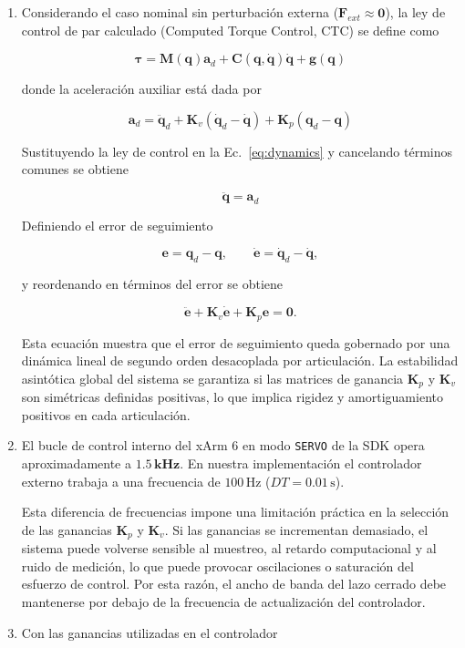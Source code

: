 \documentclass[journal,10pt,twoside]{IEEEtran}
\begin{document}
\begin{enumerate}[label=(\alph*)]

\item Considerando el caso nominal sin perturbación externa
($\bm{F}_{ext} \approx \bm{0}$), la ley de control de par calculado
(Computed Torque Control, CTC) se define como

\[
\bm{\tau} =
\bm{M}(\bm{q})\bm{a}_d
+
\bm{C}(\bm{q},\dot{\bm{q}})\dot{\bm{q}}
+
\bm{g}(\bm{q})
\]

donde la aceleración auxiliar está dada por

\[
\bm{a}_d =
\ddot{\bm{q}}_d
+
\bm{K}_v(\dot{\bm{q}}_d - \dot{\bm{q}})
+
\bm{K}_p(\bm{q}_d - \bm{q})
\]

Sustituyendo la ley de control en la Ec.~\eqref{eq:dynamics} y
cancelando términos comunes se obtiene

\[
\ddot{\bm{q}} = \bm{a}_d
\]

Definiendo el error de seguimiento

\[
\bm{e} = \bm{q}_d - \bm{q},
\qquad
\dot{\bm{e}} = \dot{\bm{q}}_d - \dot{\bm{q}},
\]

y reordenando en términos del error se obtiene

\[
\ddot{\bm{e}} + \bm{K}_v\dot{\bm{e}} + \bm{K}_p\bm{e} = \bm{0}.
\]

Esta ecuación muestra que el error de seguimiento queda gobernado
por una dinámica lineal de segundo orden desacoplada por
articulación. La estabilidad asintótica global del sistema se
garantiza si las matrices de ganancia $\bm{K}_p$ y $\bm{K}_v$
son simétricas definidas positivas, lo que implica rigidez
y amortiguamiento positivos en cada articulación.

\item El bucle de control interno del xArm 6 en modo
\texttt{SERVO} de la SDK opera aproximadamente a
$\mathbf{1.5\,kHz}$. En nuestra implementación el
controlador externo trabaja a una frecuencia de
$100\,\text{Hz}$ ($DT = 0.01\,\text{s}$).

Esta diferencia de frecuencias impone una limitación
práctica en la selección de las ganancias $\bm{K}_p$
y $\bm{K}_v$. Si las ganancias se incrementan demasiado,
el sistema puede volverse sensible al muestreo,
al retardo computacional y al ruido de medición,
lo que puede provocar oscilaciones o saturación del
esfuerzo de control. Por esta razón, el ancho de banda
del lazo cerrado debe mantenerse por debajo de la
frecuencia de actualización del controlador.

\item Con las ganancias utilizadas en el controlador


\end{enumerate}
\end{document}
